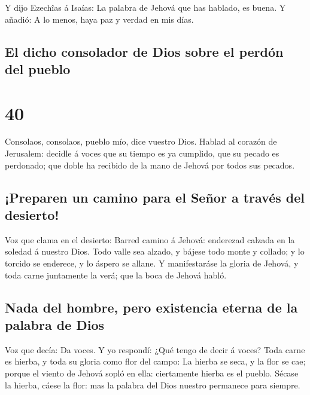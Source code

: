  Y dijo Ezechîas á Isaías: La palabra de Jehová que has
hablado, es buena. Y añadió: A lo menos, haya paz y verdad en mis días.

\hypertarget{el-dicho-consolador-de-dios-sobre-el-perduxf3n-del-pueblo}{%
\subsection{El dicho consolador de Dios sobre el perdón del
pueblo}\label{el-dicho-consolador-de-dios-sobre-el-perduxf3n-del-pueblo}}

\hypertarget{section-39}{%
\section{40}\label{section-39}}

 Consolaos, consolaos, pueblo mío, dice vuestro Dios.
 Hablad al corazón de Jerusalem: decidle á voces que su
tiempo es ya cumplido, que su pecado es perdonado; que doble ha recibido
de la mano de Jehová por todos sus pecados.

\hypertarget{preparen-un-camino-para-el-seuxf1or-a-travuxe9s-del-desierto}{%
\subsection{¡Preparen un camino para el Señor a través del
desierto!}\label{preparen-un-camino-para-el-seuxf1or-a-travuxe9s-del-desierto}}

 Voz que clama en el desierto: Barred camino á Jehová:
enderezad calzada en la soledad á nuestro Dios.  Todo valle
sea alzado, y bájese todo monte y collado; y lo torcido se enderece, y
lo áspero se allane.  Y manifestaráse la gloria de Jehová, y
toda carne juntamente la verá; que la boca de Jehová habló.

\hypertarget{nada-del-hombre-pero-existencia-eterna-de-la-palabra-de-dios}{%
\subsection{Nada del hombre, pero existencia eterna de la palabra de
Dios}\label{nada-del-hombre-pero-existencia-eterna-de-la-palabra-de-dios}}

 Voz que decía: Da voces. Y yo respondí: ¿Qué tengo de decir
á voces? Toda carne es hierba, y toda su gloria como flor del campo:
 La hierba se seca, y la flor se cae; porque el viento de
Jehová sopló en ella: ciertamente hierba es el pueblo. 
Sécase la hierba, cáese la flor: mas la palabra del Dios nuestro
permanece para siempre.

